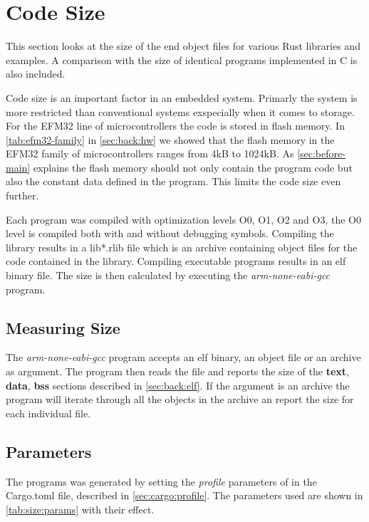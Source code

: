 \section{Code Size}

This section looks at the size of the end object files for various Rust libraries and examples.
A comparison with the size of identical programs implemented in C is also included.

Code size is an important factor in an embedded system.
Primarly the system is more restricted than conventional systems exspecially when it comes to storage.
For the EFM32 line of microcontrollers the code is stored in flash memory.
In \autoref{tab:efm32-family} in \autoref{sec:back:hw} we showed that the flash memory in the EFM32 family of microcontrollers ranges from 4kB to 1024kB.
As \autoref{sec:before-main} explains the flash memory should not only contain the program code but also the constant data defined in the program.
This limits the code size even further.

Each program was compiled with optimization levels O0, O1, O2 and O3, the O0 level is compiled both with and without debugging symbols.
Compiling the library results in a lib*.rlib file which is an archive containing object files for the code contained in the library.
Compiling executable programs results in an elf binary file.
The size is then calculated by executing the \emph{arm-none-eabi-gcc} program.

\subsection{Measuring Size}

The \emph{arm-none-eabi-gcc} program accepts an elf binary, an object file or an archive as argument.
The program then reads the file and reports the size of the \textbf{text}, \textbf{data}, \textbf{bss} sections described in \autoref{sec:back:elf}.
If the argument is an archive the program will iterate through all the objects in the archive an report the size for each individual file.

\subsection{Parameters}
\label{sec:size:params}
The programs was generated by setting the \emph{profile} parameters of in the Cargo.toml file, described in \autoref{sec:cargo:profile}.
The parameters used are shown in \autoref{tab:size:params} with their effect.

